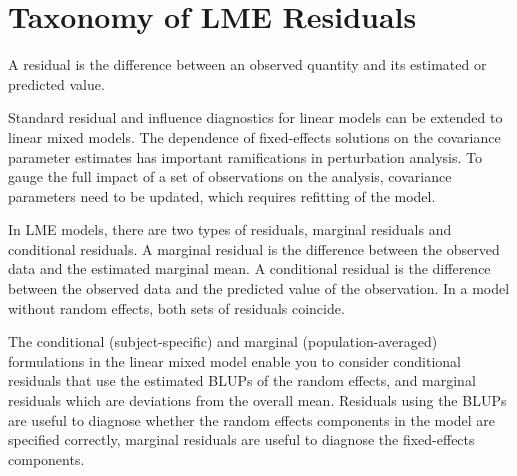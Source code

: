 \documentclass[12pt, a4paper]{report}
\theoremstyle{plain}
\theoremstyle{definition}
\theoremstyle{remark}
\begin{document}
%	
%	
%	
%	
%	
%	
%	


\section{Taxonomy of LME Residuals}
		A residual is the difference between an observed quantity and its estimated or predicted value. 

Standard residual and influence diagnostics for linear models can
be extended to linear mixed models. The dependence of
fixed-effects solutions on the covariance parameter estimates has
important ramifications in perturbation analysis. To gauge the
full impact of a set of observations on the analysis, covariance
parameters need to be updated, which requires refitting of the
model.

		In LME models, there are two types of residuals, marginal residuals and conditional residuals. A marginal residual is the difference between the observed data and the estimated marginal mean. A conditional residual is the difference between the observed data and the predicted value of the observation. In a model without random effects, both sets of residuals coincide.
		
		
The conditional (subject-specific) and marginal (population-averaged) formulations in the linear mixed model enable you to consider conditional residuals that use the estimated BLUPs of the random effects, and marginal residuals which are deviations from the overall mean. Residuals using the BLUPs are useful to diagnose whether the random effects components
in the model are specified correctly, marginal residuals are useful to diagnose the fixed-effects components.	
\end{document}
